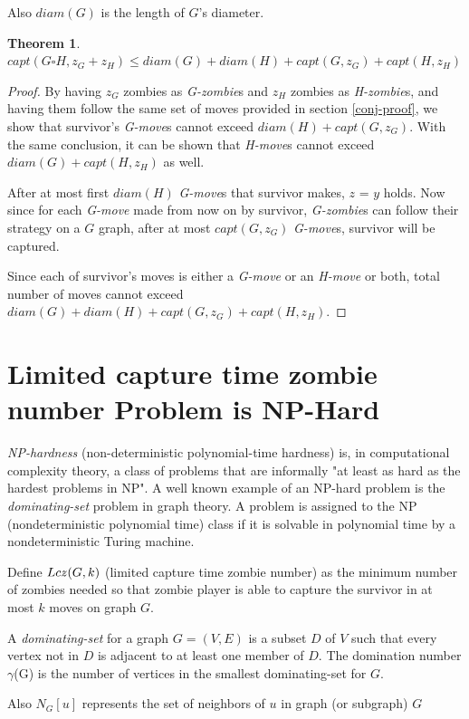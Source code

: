 \documentclass[1p]{elsarticle}
\newtheorem{theorem}{Theorem}
\newcommand{\zn}{\ooalign{$z$\cr\hfil\rule[.5ex]{.2em}{.08ex}\hfil\cr}}
\begin{document}
	Also $diam(G)$ is the length of $G$'s diameter.
	\begin{theorem}
		\label{T5}
		$capt( G \square H, z_G + z_H ) \leq diam(G) + diam(H) + capt(G, z_G) + capt(H, z_H)$
	\end{theorem}
	\begin{proof}
		By having $z_G$ zombies as {\it G-zombie}s and $z_H$ zombies as {\it H-zombie}s, and having them follow the same
		set of moves provided in section \ref{conj-proof}, we show that survivor's {\it G-move}s cannot exceed $diam(H)
		+ capt(G, z_G)$. With the same conclusion, it can be shown that {\it H-move}s cannot exceed $diam(G) + capt(H, z_H)$
		as well.

		After at most first $diam(H)$ {\it G-move}s that survivor makes, $z$ = $y$ holds. Now since for each {\it
		G-move} made from now on by survivor, {\it G-zombie}s can follow their strategy on a $G$ graph, after at most
		$capt(G,z_G)$ {\it G-move}s, survivor will be captured. 
		
		Since each of survivor's moves is either a {\it G-move} or an {\it H-move} or both, total number of moves cannot
		exceed $diam(G) + diam(H) + capt(G, z_G) + capt(H, z_H)$.
	\end{proof}
\section{Limited capture time zombie number Problem is NP-Hard}\label{np-capturetime}

	{\it NP-hardness} (non-deterministic polynomial-time hardness) is, in computational complexity theory, a class of problems
	that are informally "at least as hard as the hardest problems in NP". A well known example of an NP-hard problem is
	the {\it dominating-set} problem in graph theory. A problem is assigned to the NP (nondeterministic polynomial time) class
	if it is solvable in polynomial time by a nondeterministic Turing machine.


	Define $Lc\zn(G,k)$ (limited capture time zombie number) as the minimum number of zombies needed so that zombie player is able to capture the survivor in
	at most $k$ moves on graph $G$. 

	A {\it dominating-set} for a graph $G = (V, E)$ is a subset $D$ of $V$ such that every vertex not in $D$ is adjacent
	to at least one member of $D$. The domination number $\gamma$(G) is the number of vertices in the smallest
	dominating-set for $G$.

	Also $N_G[u]$ represents the set of neighbors of $u$ in graph (or subgraph) $G$
	
\end{document}
